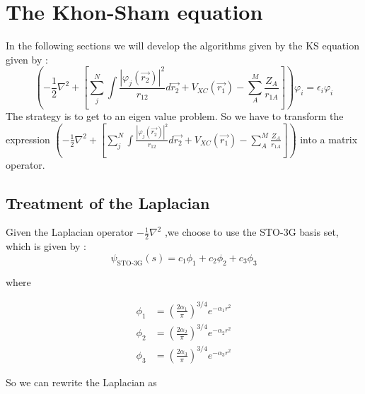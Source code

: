 \documentclass{article}
\begin{document}
\section{The Khon-Sham equation}

In the following sections we will develop the algorithms given by the KS equation given by : 
\[\left(-\frac{1}{2} \nabla^2 + \left[\sum_{j}^{N}\int \frac{|\varphi_j(\vec{r_2})|^2}{r_{12}}d\vec{r_2} + V_{XC}(\vec{r_1})- \sum_{A}^{M}\frac{Z_A}{r_{1A}} \right]\right)\varphi_i = \epsilon_i\varphi_i\]
The strategy is to get to an eigen value problem. So we have to  transform the expression
 $ \left(-\frac{1}{2} \nabla^2 + \left[\sum_{j}^{N}\int \frac{|\varphi_j(\vec{r_2})|^2}{r_{12}}d\vec{r_2} + V_{XC}(\vec{r_1})- \sum_{A}^{M}\frac{Z_A}{r_{1A}} \right]\right)$ 
 into a matrix operator.
\subsection{Treatment of the Laplacian}
Given the Laplacian operator $-\frac{1}{2}\nabla^2$ ,we choose to use the STO-3G basis set, which is given by : 
\begin{equation*}
    \psi_{\text{STO-3G}}(s) = c_1 \phi_1 + c_2 \phi_2 + c_3 \phi_3
    \end{equation*}

where

    \begin{align*}
    \phi_1 &= \left( \frac{2\alpha_1}{\pi} \right)^{3/4} e^{-\alpha_1 r^2} \\
    \phi_2 &= \left( \frac{2\alpha_2}{\pi} \right)^{3/4} e^{-\alpha_2 r^2} \\
    \phi_3 &= \left( \frac{2\alpha_3}{\pi} \right)^{3/4} e^{-\alpha_3 r^2}
    \end{align*}

So we can rewrite the Laplacian as 
\end{document}
